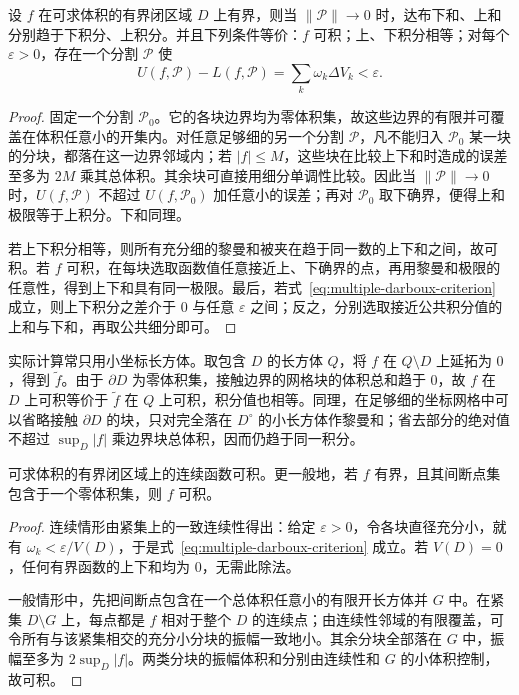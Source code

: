 \begin{theorem}
\label{thm:multiple-darboux-criterion}
设 $f$ 在可求体积的有界闭区域 $D$ 上有界，则当 $\|\mathcal P\|\to0$ 时，达布下和、上和分别趋于下积分、上积分。并且下列条件等价：$f$ 可积；上、下积分相等；对每个 $\varepsilon>0$，存在一个分割 $\mathcal P$ 使
\begin{equation}
    U(f,\mathcal P)-L(f,\mathcal P)
    =\sum_k\omega_k\Delta V_k<\varepsilon.
    \label{eq:multiple-darboux-criterion}
\end{equation}
\end{theorem}
\begin{proof}
固定一个分割 $\mathcal P_0$。它的各块边界均为零体积集，故这些边界的有限并可覆盖在体积任意小的开集内。对任意足够细的另一个分割 $\mathcal P$，凡不能归入 $\mathcal P_0$ 某一块的分块，都落在这一边界邻域内；若 $|f|\leq M$，这些块在比较上下和时造成的误差至多为 $2M$ 乘其总体积。其余块可直接用细分单调性比较。因此当 $\|\mathcal P\|\to0$ 时，$U(f,\mathcal P)$ 不超过 $U(f,\mathcal P_0)$ 加任意小的误差；再对 $\mathcal P_0$ 取下确界，便得上和极限等于上积分。下和同理。

若上下积分相等，则所有充分细的黎曼和被夹在趋于同一数的上下和之间，故可积。若 $f$ 可积，在每块选取函数值任意接近上、下确界的点，再用黎曼和极限的任意性，得到上下和具有同一极限。最后，若式~\eqref{eq:multiple-darboux-criterion} 成立，则上下积分之差介于 $0$ 与任意 $\varepsilon$ 之间；反之，分别选取接近公共积分值的上和与下和，再取公共细分即可。
\end{proof}

实际计算常只用小坐标长方体。取包含 $D$ 的长方体 $Q$，将 $f$ 在 $Q\setminus D$ 上延拓为 $0$，得到 $\widetilde f$。由于 $\partial D$ 为零体积集，接触边界的网格块的体积总和趋于 $0$，故 $f$ 在 $D$ 上可积等价于 $\widetilde f$ 在 $Q$ 上可积，积分值也相等。同理，在足够细的坐标网格中可以省略接触 $\partial D$ 的块，只对完全落在 $D^\circ$ 的小长方体作黎曼和；省去部分的绝对值不超过 $\sup_D|f|$ 乘边界块总体积，因而仍趋于同一积分。

\begin{theorem}
\label{thm:multiple-continuous-integrable}
可求体积的有界闭区域上的连续函数可积。更一般地，若 $f$ 有界，且其间断点集包含于一个零体积集，则 $f$ 可积。
\end{theorem}
\begin{proof}
连续情形由紧集上的一致连续性得出：给定 $\varepsilon>0$，令各块直径充分小，就有 $\omega_k<\varepsilon/V(D)$，于是式~\eqref{eq:multiple-darboux-criterion} 成立。若 $V(D)=0$，任何有界函数的上下和均为 $0$，无需此除法。

一般情形中，先把间断点包含在一个总体积任意小的有限开长方体并 $G$ 中。在紧集 $D\setminus G$ 上，每点都是 $f$ 相对于整个 $D$ 的连续点；由连续性邻域的有限覆盖，可令所有与该紧集相交的充分小分块的振幅一致地小。其余分块全部落在 $G$ 中，振幅至多为 $2\sup_D|f|$。两类分块的振幅体积和分别由连续性和 $G$ 的小体积控制，故可积。
\end{proof}

